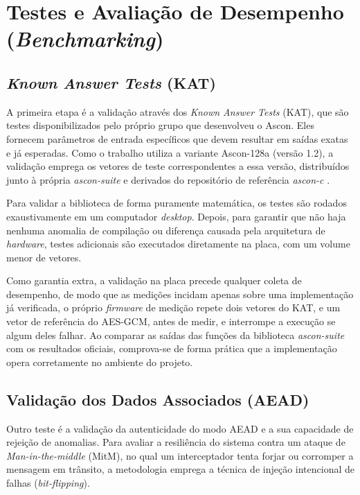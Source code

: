 \section{Testes e Avaliação de Desempenho (\textit{Benchmarking})}
\label{subsec:validacao-ascon}
\subsection{\textit{Known Answer Tests} (KAT)}
A primeira etapa é a validação através dos \textit{Known Answer Tests} (KAT), que são testes disponibilizados pelo próprio grupo que desenvolveu o Ascon. Eles fornecem parâmetros de entrada específicos que devem resultar em saídas exatas e já esperadas. Como o trabalho utiliza a variante Ascon-128a (versão 1.2), a validação emprega os vetores de teste correspondentes a essa versão, distribuídos junto à própria \textit{ascon-suite} e derivados do repositório de referência \textit{ascon-c} \cite{ascon_reference_c}.

Para validar a biblioteca de forma puramente matemática, os testes são rodados exaustivamente em um computador \textit{desktop}. Depois, para garantir que não haja nenhuma anomalia de compilação ou diferença causada pela arquitetura de \textit{hardware}, testes adicionais são executados diretamente na placa, com um volume menor de vetores.

Como garantia extra, a validação na placa precede qualquer coleta de desempenho, de modo que as medições incidam apenas sobre uma implementação já verificada, o próprio \textit{firmware} de medição repete dois vetores do KAT, e um vetor de referência do AES-GCM, antes de medir, e interrompe a execução se algum deles falhar. Ao comparar as saídas das funções da biblioteca \textit{ascon-suite} com os resultados oficiais, comprova-se de forma prática que a implementação opera corretamente no ambiente do projeto.


\subsection{Validação dos Dados Associados (AEAD)}
Outro teste é a validação da autenticidade do modo AEAD e a sua capacidade de rejeição de anomalias. Para avaliar a resiliência do sistema contra um ataque de \textit{Man-in-the-middle} (MitM), no qual um interceptador tenta forjar ou corromper a mensagem em trânsito, a metodologia emprega a técnica de injeção intencional de falhas (\textit{bit-flipping}).

